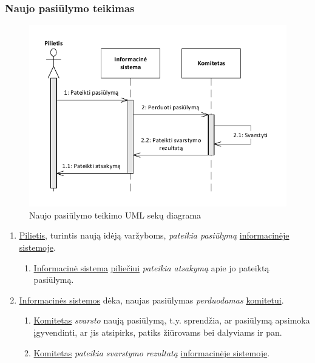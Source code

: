 \documentclass{VUMIFPSkursinis}
\begin{document}
    \subsubsection*{Naujo pasiūlymo teikimas}
	    \begin{figure}[H]
        \centering
        \includegraphics[width=\textwidth]{img/ScenarijausSekuDiagrama3}
        \caption{Naujo pasiūlymo teikimo UML sekų diagrama}
        \label{fig:scenarijusPasiulymoSekuDiagrama}
      \end{figure}
      
      \begin{enumerate}
        \item \underline{Pilietis}, turintis naują idėją varžyboms, \textit{pateikia pasiūlymą} \underline{informacinėje sistemoje}.
          \begin{enumerate}
            \item \underline{Informacinė sistema} \underline{piliečiui} \textit{pateikia atsakymą} apie jo pateiktą pasiūlymą.
          \end{enumerate}
        \item \underline{Informacinės sistemos} dėka, naujas pasiūlymas \textit{perduodamas} \underline{komitetui}.
          \begin{enumerate}
            \item \underline{Komitetas} \textit{svarsto} naują pasiūlymą, t.y. sprendžia, ar pasiūlymą apsimoka įgyvendinti, ar jis atsipirks, patiks žiūrovams bei dalyviams ir pan.
            \item \underline{Komitetas} \textit{pateikia svarstymo rezultatą} \underline{informacinėje sistemoje}.
          \end{enumerate}
      \end{enumerate}
      
\end{document}
